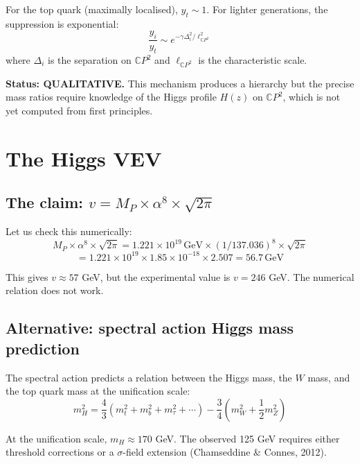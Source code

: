 \documentclass[11pt,a4paper]{article}
\newcommand{\CP}{\mathbb{C}P}
\begin{document}
For the top quark (maximally localised), $y_t \sim 1$. For lighter generations, the suppression is exponential:
\begin{equation}
\frac{y_i}{y_t} \sim e^{-\gamma \Delta_i^2/\ell_{\CP^2}^2}
\end{equation}
where $\Delta_i$ is the separation on $\CP^2$ and $\ell_{\CP^2}$ is the characteristic scale.

\textbf{Status: QUALITATIVE.} This mechanism produces a hierarchy but the precise mass ratios require knowledge of the Higgs profile $H(z)$ on $\CP^2$, which is not yet computed from first principles.

\section{The Higgs VEV}

\subsection{The claim: $v = M_P \times \alpha^8 \times \sqrt{2\pi}$}

Let us check this numerically:
\begin{equation}
M_P \times \alpha^8 \times \sqrt{2\pi} = 1.221 \times 10^{19}\,\text{GeV} \times (1/137.036)^8 \times \sqrt{2\pi}
\end{equation}
\begin{equation}
= 1.221 \times 10^{19} \times 1.85 \times 10^{-18} \times 2.507 = 56.7\,\text{GeV}
\end{equation}

This gives $v \approx 57$ GeV, but the experimental value is $v = 246$ GeV. The numerical relation does not work.

\subsection{Alternative: spectral action Higgs mass prediction}

The spectral action predicts a relation between the Higgs mass, the $W$ mass, and the top quark mass at the unification scale:
\begin{equation}
m_H^2 = \frac{4}{3}\left(m_t^2 + m_b^2 + m_\tau^2 + \cdots\right) - \frac{3}{4}(m_W^2 + \frac{1}{2}m_Z^2)
\end{equation}

At the unification scale, $m_H \approx 170$ GeV. The observed 125 GeV requires either threshold corrections or a $\sigma$-field extension (Chamseddine \& Connes, 2012).
\end{document}
